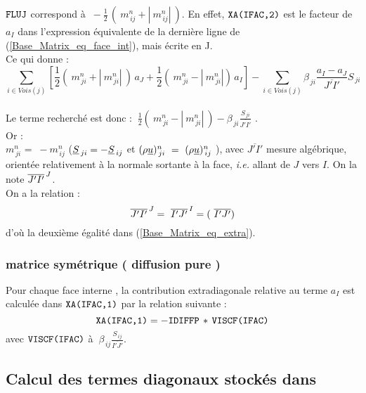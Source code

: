 $\text{\texttt{FLUJ}}$ correspond à $\ -\displaystyle\frac{1}{2}\,(\ m_{\,ij}^n + |\
m_{\,ij}^n|\ )$. En effet, $\text{\texttt{XA(IFAC,2)}}$ est le facteur de $a_I$ dans l'expression équivalente de
la dernière ligne de (\ref{Base_Matrix_eq_face_int}), mais écrite en J.\\
Ce qui donne :\\
\begin{equation}\label{Base_Matrix_eq_extra_J}
\sum\limits_{i\in
Vois(j)}\left[\displaystyle\frac{1}{2}(\ m_{\,ji}^n + |\ m_{\,ji}^n|\ )\,a_J +
\displaystyle\frac{1}{2}(\ m_{\,ji}^n - |\ m_{\,ji}^n|)\,a_I\right]
 - \sum\limits_{i\in Vois(j)}\displaystyle \beta_{\,ji}\frac{a_I - a_J}{\overline{J'I'}} S_{\,ji}
\end{equation}\\
Le terme recherché est donc :
$\ \displaystyle\frac{1}{2}(\ m_{\,ji}^n - |\ m_{\,ji}^n|\ )-\displaystyle
\beta_{\,ji}\frac {S_{\,ji}}{\overline{J'I'}}$ .\\
Or :\\ $ m_{\,ji}^n $ = $\ - m_{\,ij}^n $  ($\underline{S}_{\,ji} = -
\underline{S}_{\,ij}$ et $(\rho \underline{u})_{\,ji}^n\  =\ (\rho \underline{u})_{\,ij}^n\
$), avec $\overline{J'I'}$ mesure algébrique, orientée relativement à la
normale sortante à la face, {\it i.e.} allant de $J$ vers $I$. On la note
${\overline{J'I'}^{\tiny {\,J}}}$. \\
On a la relation :\\
\begin{equation}\label{Base_Matrix_Eq_mesure_alg}
\overline{J'I'}^{\tiny {\,J}}=\ \overline{I'J'}^{\tiny {\,I}} = (\ \overline{I'J'})
\end{equation}
d'où la deuxième égalité dans (\ref{Base_Matrix_eq_extra}).
\subsubsection*{matrice symétrique ( diffusion pure ) }
Pour chaque face interne \var{IFAC}, la contribution extradiagonale relative au
terme $a_I$ est calculée dans
$\text{\texttt{XA(IFAC,1)}}$ par la  relation suivante :\\
\begin{equation}
\text{\texttt{XA(IFAC,1)}} =  - \text{\texttt{IDIFFP}}\,*\,\text{\texttt{VISCF(IFAC)}}\\
\end{equation}
avec $\text{\texttt{VISCF(IFAC)}} $ à $ \ \displaystyle \beta_{\,ij}\frac {
S_{\,ij}}{\overline{I'J'}} $.
\subsection*{\bf Calcul des termes diagonaux stockés dans \var{DA} }
